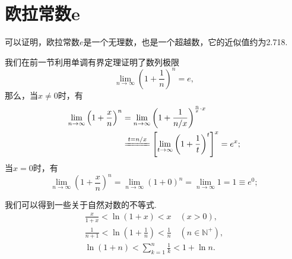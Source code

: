 \section{欧拉常数e}
可以证明，欧拉常数\(e\)是一个无理数，也是一个超越数，它的近似值约为2.718.

我们在前一节利用单调有界定理证明了数列极限\[
\lim_{n\to\infty} \left(1+\frac{1}{n}\right)^n = e,
\]
那么，当\(x\neq0\)时，有
\begin{align*}
	\lim_{n\to\infty} \left(1+\frac{x}{n}\right)^n
	&= \lim_{n\to\infty} \left(1+\frac{1}{n/x}\right)^{\frac{n}{x} \cdot x} \\
	&\xlongequal{t=n/x} \left[ \lim_{t\to\infty} \left(1+\frac{1}{t}\right)^t \right]^x
	= e^x;
\end{align*}
当\(x=0\)时，有\[
	\lim_{n\to\infty} \left(1+\frac{x}{n}\right)^n
	= \lim_{n\to\infty} (1+0)^n
	= \lim_{n\to\infty} 1
	= 1 \equiv e^0;
\]

我们可以得到一些关于自然对数的不等式.
\begin{gather}
	\frac{x}{1+x} < \ln(1+x) < x
	\quad(x>0), \\
	\frac{1}{n+1} < \ln(1+\frac{1}{n}) < \frac{1}{n}
	\quad(n\in\mathbb{N}^+), \\
	\ln(1+n) < \sum_{k=1}^n \frac{1}{k} < 1 + \ln n.
\end{gather}
